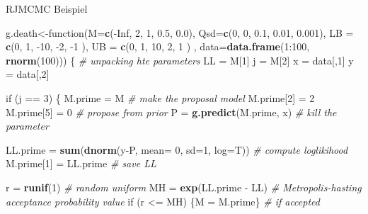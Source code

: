\documentclass[ignorenonframetext,]{beamer}
\newenvironment{Shaded}{\begin{snugshade}}{\end{snugshade}}
\newcommand{\KeywordTok}[1]{\textcolor[rgb]{0.13,0.29,0.53}{\textbf{{#1}}}}
\newcommand{\DataTypeTok}[1]{\textcolor[rgb]{0.13,0.29,0.53}{{#1}}}
\newcommand{\DecValTok}[1]{\textcolor[rgb]{0.00,0.00,0.81}{{#1}}}
\newcommand{\FloatTok}[1]{\textcolor[rgb]{0.00,0.00,0.81}{{#1}}}
\newcommand{\StringTok}[1]{\textcolor[rgb]{0.31,0.60,0.02}{{#1}}}
\newcommand{\CommentTok}[1]{\textcolor[rgb]{0.56,0.35,0.01}{\textit{{#1}}}}
\newcommand{\OtherTok}[1]{\textcolor[rgb]{0.56,0.35,0.01}{{#1}}}
\newcommand{\NormalTok}[1]{{#1}}
\begin{document}
\begin{frame}{RJMCMC Beispiel}
\begin{Shaded}
\begin{Highlighting}[]
\NormalTok{g.death<-function(}\DataTypeTok{M=}\KeywordTok{c}\NormalTok{(-}\OtherTok{Inf}\NormalTok{, }\DecValTok{2}\NormalTok{, }\DecValTok{1}\NormalTok{, }\FloatTok{0.5}\NormalTok{, }\FloatTok{0.0}\NormalTok{), }\DataTypeTok{Qsd=}\KeywordTok{c}\NormalTok{(}\DecValTok{0}\NormalTok{, }\DecValTok{0}\NormalTok{, }\FloatTok{0.1}\NormalTok{, }\FloatTok{0.01}\NormalTok{, }\FloatTok{0.001}\NormalTok{), }\DataTypeTok{LB =} \KeywordTok{c}\NormalTok{(}\DecValTok{0}\NormalTok{, }\DecValTok{1}\NormalTok{, -}\DecValTok{10}\NormalTok{, -}\DecValTok{2}\NormalTok{, -}\DecValTok{1} \NormalTok{), }\DataTypeTok{UB =} \KeywordTok{c}\NormalTok{(}\DecValTok{0}\NormalTok{, }\DecValTok{1}\NormalTok{, }\DecValTok{10}\NormalTok{, }\DecValTok{2}\NormalTok{, }\DecValTok{1} \NormalTok{)  , }\DataTypeTok{data=}\KeywordTok{data.frame}\NormalTok{(}\DecValTok{1}\NormalTok{:}\DecValTok{100}\NormalTok{, }\KeywordTok{rnorm}\NormalTok{(}\DecValTok{100}\NormalTok{)))}
\NormalTok{\{}
\CommentTok{# unpacking hte parameters}
\NormalTok{LL    =}\StringTok{ }\NormalTok{M[}\DecValTok{1}\NormalTok{]}
\NormalTok{j     =}\StringTok{ }\NormalTok{M[}\DecValTok{2}\NormalTok{]}
\NormalTok{x     =}\StringTok{ }\NormalTok{data[,}\DecValTok{1}\NormalTok{]}
\NormalTok{y     =}\StringTok{ }\NormalTok{data[,}\DecValTok{2}\NormalTok{]}

\NormalTok{if (j ==}\StringTok{ }\DecValTok{3}\NormalTok{)}
\NormalTok{\{}
\NormalTok{M.prime =}\StringTok{ }\NormalTok{M                                           }\CommentTok{# make the proposal model}
\NormalTok{M.prime[}\DecValTok{2}\NormalTok{] =}\StringTok{ }\DecValTok{2}
\NormalTok{M.prime[}\DecValTok{5}\NormalTok{] =}\StringTok{ }\DecValTok{0}                                        \CommentTok{# propose from prior}
\NormalTok{P =}\StringTok{ }\KeywordTok{g.predict}\NormalTok{(M.prime, x)                             }\CommentTok{# kill the parameter}

\NormalTok{LL.prime =}\StringTok{ }\KeywordTok{sum}\NormalTok{(}\KeywordTok{dnorm}\NormalTok{(y-P, }\DataTypeTok{mean=} \DecValTok{0}\NormalTok{, }\DataTypeTok{sd=}\DecValTok{1}\NormalTok{, }\DataTypeTok{log=}\NormalTok{T))      }\CommentTok{# compute loglikihood}
\NormalTok{M.prime[}\DecValTok{1}\NormalTok{] =}\StringTok{ }\NormalTok{LL.prime                                 }\CommentTok{# save LL}

\NormalTok{r =}\StringTok{ }\KeywordTok{runif}\NormalTok{(}\DecValTok{1}\NormalTok{)                                          }\CommentTok{# random uniform}
\NormalTok{MH =}\StringTok{ }\KeywordTok{exp}\NormalTok{(LL.prime -}\StringTok{ }\NormalTok{LL)                               }\CommentTok{# Metropolis-hasting acceptance probability value}
\NormalTok{if (r <=}\StringTok{ }\NormalTok{MH) \{M =}\StringTok{ }\NormalTok{M.prime\}                            }\CommentTok{# if accepted}


\end{Highlighting}
\end{Shaded}
\end{frame}
\end{document}
